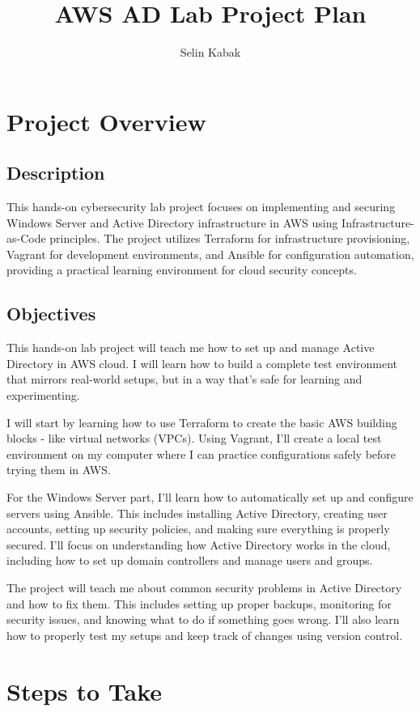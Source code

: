\documentclass[11pt,a4paper]{article}
\title{\textbf{AWS AD Lab Project Plan}}
\author{Selin Kabak}
\begin{document}
\maketitle

\section{Project Overview}
\subsection{Description}
This hands-on cybersecurity lab project focuses on implementing and securing Windows Server and Active Directory infrastructure in AWS using Infrastructure-as-Code principles. The project utilizes Terraform for infrastructure provisioning, Vagrant for development environments, and Ansible for configuration automation, providing a practical learning environment for cloud security concepts.

\subsection{Objectives}
This hands-on lab project will teach me how to set up and manage Active Directory in AWS cloud. I will learn how to build a complete test environment that mirrors real-world setups, but in a way that's safe for learning and experimenting.

I will start by learning how to use Terraform to create the basic AWS building blocks - like virtual networks (VPCs). Using Vagrant, I'll create a local test environment on my computer where I can practice configurations safely before trying them in AWS.

For the Windows Server part, I'll learn how to automatically set up and configure servers using Ansible. This includes installing Active Directory, creating user accounts, setting up security policies, and making sure everything is properly secured. I'll focus on understanding how Active Directory works in the cloud, including how to set up domain controllers and manage users and groups.

The project will teach me about common security problems in Active Directory and how to fix them. This includes setting up proper backups, monitoring for security issues, and knowing what to do if something goes wrong. I'll also learn how to properly test my setups and keep track of changes using version control.

\section{Steps to Take}
\end{document}
